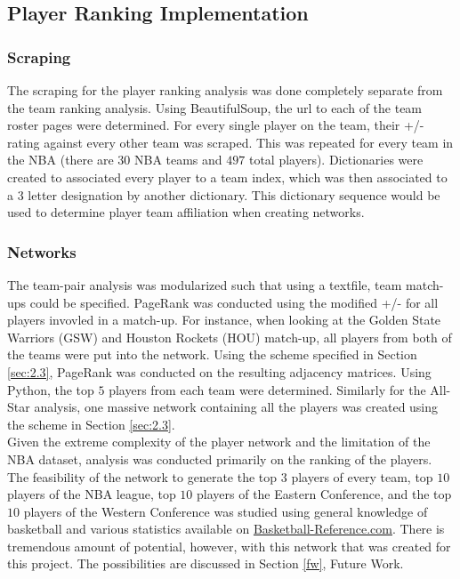 \documentclass[12pt]{article}%
\begin{document}
\subsection{Player Ranking Implementation}
\label{playerimp}
\subsubsection{Scraping}
\label{playerimp_scraping}
\null\quad\quad The scraping for the player ranking analysis was done completely separate from the team ranking analysis. Using BeautifulSoup, the url to each of the team roster pages were determined. For every single player on the team, their +/- rating against every other team was scraped. This was repeated for every team in the NBA (there are $30$ NBA teams and $497$ total players). Dictionaries were created to associated every player to a team index, which was then associated to a 3 letter designation by another dictionary. This dictionary sequence would be used to determine player team affiliation when creating networks.

\subsubsection{Networks}
\label{playerimp_networks}
\null\quad\quad The team-pair analysis was modularized such that using a textfile, team match-ups could be specified. PageRank was conducted using the modified +/- for all players invovled in a match-up. For instance, when looking at the Golden State Warriors (GSW) and Houston Rockets (HOU) match-up, all players from both of the teams were put into the network. Using the scheme specified in Section \ref{sec:2.3}, PageRank was conducted on the resulting adjacency matrices. Using Python, the top $5$ players from each team were determined. Similarly for the All-Star analysis, one massive network containing all the players was created using the scheme in Section \ref{sec:2.3}.\\
\null\quad\quad Given the extreme complexity of the player network and the limitation of the NBA dataset, analysis was conducted primarily on the ranking of the players. The feasibility of the network to generate the top $3$ players of every team, top $10$ players of the NBA league, top $10$ players of the Eastern Conference, and the top $10$ players of the Western Conference was studied using general knowledge of basketball and various statistics available on \href{https://www.basketball-reference.com/}{Basketball-Reference.com}. There is tremendous amount of potential, however, with this network that was created for this project. The possibilities are discussed in Section \ref{fw}, Future Work.
\end{document}
